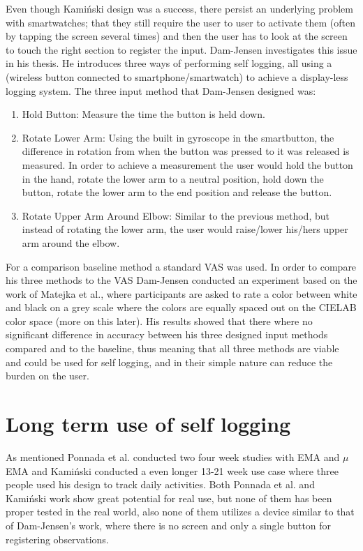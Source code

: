 Even though Kami\'nski design was a success, there persist an underlying problem with smartwatches; that they still require the user to user to activate them (often by tapping the screen several times) and then the user has to look at the screen to touch the right section to register the input. Dam-Jensen\cite{dam} investigates this issue in his thesis. He introduces three ways of performing self logging, all using a  (wireless button connected to smartphone/smartwatch) to achieve a display-less logging system. The three input method that Dam-Jensen designed was:

\begin{enumerate}
	\item Hold Button: Measure the time the button is held down.
	\item Rotate Lower Arm: Using the built in gyroscope in the smartbutton, the difference in rotation from when the button was pressed to it was released is measured. In order to achieve a measurement the user would hold the button in the hand, rotate the lower arm to a neutral position, hold down the button, rotate the lower arm to the end position and release the button. 
	\item Rotate Upper Arm Around Elbow: Similar to the previous method, but instead of rotating the lower arm, the user would raise/lower his/hers upper arm around the elbow.
\end{enumerate}

For a comparison baseline method a standard VAS was used. In order to compare his three methods to the VAS Dam-Jensen conducted an experiment based on the work of Matejka et al.\cite{grey}, where participants are asked to rate a color between white and black on a grey scale where the colors are equally spaced out on the CIELAB color space\cite{cielab} (more on this later). His results showed that there where no significant difference in accuracy between his three designed input methods compared and to the baseline, thus meaning that all three methods are viable and could be used for self logging, and in their simple nature can reduce the burden on the user.








\section{Long term use of self logging}
As mentioned Ponnada et al.\cite{compare} conducted two four week studies with EMA and $\mu$EMA and Kami\'nski conducted a even longer 13-21 week use case where three people used his design to track daily activities. Both Ponnada et al. and Kami\'nski work show great potential for real use, but none of them has been proper tested in the real world, also none of them utilizes a device similar to that of Dam-Jensen's work, where there is no screen and only a single button for registering observations.


